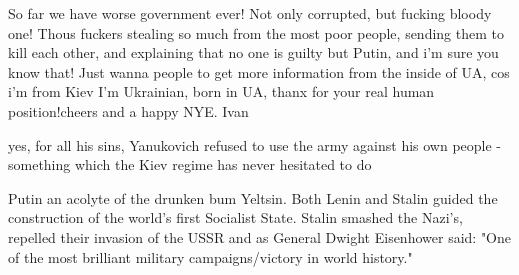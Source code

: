 \begin{itemize}
\begin{itemize}
\end{itemize} %


So far we have worse government ever! Not only corrupted, but fucking bloody
one! Thous fuckers stealing so much from the most poor people, sending them to
kill each other, and explaining that no one is guilty but Putin, and i'm sure
you know that! Just wanna people to get more information from the inside of UA,
cos i'm from Kiev I'm Ukrainian, born in UA, thanx for your real human
position!cheers and a happy NYE. Ivan

\begin{itemize} %

yes, for all his sins, Yanukovich refused to use the army against his own
people - something which the Kiev regime has never hesitated to do



Putin an acolyte of the drunken bum Yeltsin. Both Lenin and Stalin guided the
construction of the world's first Socialist State. Stalin smashed the Nazi's,
repelled their invasion of the USSR and as General Dwight Eisenhower said: "One
of the most brilliant military campaigns/victory in world history."

\end{itemize} %

\end{itemize} %
